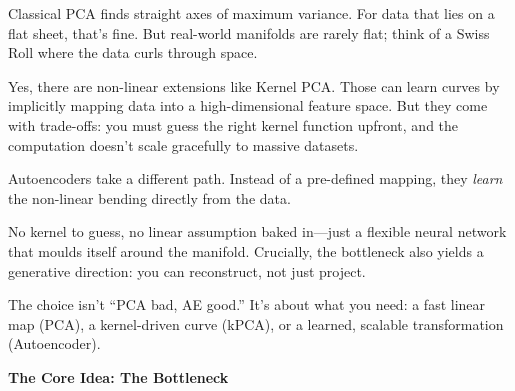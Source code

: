 \documentclass[11pt]{article}
\begin{document}
\vspace{0.3in}

Classical PCA finds straight axes of maximum variance. For data that lies on a flat sheet, that's fine. But real-world manifolds are rarely flat; think of a Swiss Roll where the data curls through space. 

\vspace{0.2in}

Yes, there are non-linear extensions like Kernel PCA. Those can learn curves by implicitly mapping data into a high-dimensional feature space. But they come with trade-offs: you must guess the right kernel function upfront, and the computation doesn't scale gracefully to massive datasets.

\vspace{0.2in}

Autoencoders take a different path. Instead of a pre-defined mapping, they \textit{learn} the non-linear bending directly from the data. 

\vspace{0.2in}

No kernel to guess, no linear assumption baked in—just a flexible neural network that moulds itself around the manifold. Crucially, the bottleneck also yields a generative direction: you can reconstruct, not just project.

\vspace{0.3in}

\begin{tcolorbox}[
    colback=brandlight,
    colframe=brandblue,
    arc=5pt,
    boxrule=0.8pt,
    left=15pt, right=15pt, top=10pt, bottom=10pt
]
\color{brandnavy}
The choice isn't ``PCA bad, AE good.'' It's about what you need: a fast linear map (PCA), a kernel-driven curve (kPCA), or a learned, scalable transformation (Autoencoder).
\end{tcolorbox}

\newpage


\vspace*{1.0in}

\begin{center}
{\fontsize{26}{30}\selectfont\color{brandnavy}\bfseries The Core Idea: The Bottleneck}
\end{center}

\vspace{0.3in}
\end{document}
